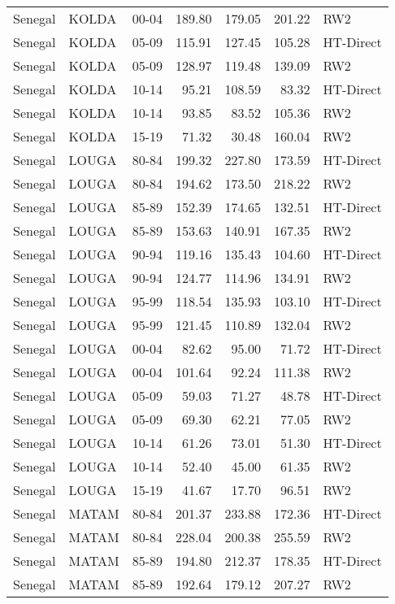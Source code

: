 \begin{longtable}{lllrrrl}
  Senegal & KOLDA & 00-04 & 189.80 & 179.05 & 201.22 & RW2 \\ 
  Senegal & KOLDA & 05-09 & 115.91 & 127.45 & 105.28 & HT-Direct \\ 
  Senegal & KOLDA & 05-09 & 128.97 & 119.48 & 139.09 & RW2 \\ 
  Senegal & KOLDA & 10-14 & 95.21 & 108.59 & 83.32 & HT-Direct \\ 
  Senegal & KOLDA & 10-14 & 93.85 & 83.52 & 105.36 & RW2 \\ 
  Senegal & KOLDA & 15-19 & 71.32 & 30.48 & 160.04 & RW2 \\ 
  Senegal & LOUGA & 80-84 & 199.32 & 227.80 & 173.59 & HT-Direct \\ 
  Senegal & LOUGA & 80-84 & 194.62 & 173.50 & 218.22 & RW2 \\ 
  Senegal & LOUGA & 85-89 & 152.39 & 174.65 & 132.51 & HT-Direct \\ 
  Senegal & LOUGA & 85-89 & 153.63 & 140.91 & 167.35 & RW2 \\ 
  Senegal & LOUGA & 90-94 & 119.16 & 135.43 & 104.60 & HT-Direct \\ 
  Senegal & LOUGA & 90-94 & 124.77 & 114.96 & 134.91 & RW2 \\ 
  Senegal & LOUGA & 95-99 & 118.54 & 135.93 & 103.10 & HT-Direct \\ 
  Senegal & LOUGA & 95-99 & 121.45 & 110.89 & 132.04 & RW2 \\ 
  Senegal & LOUGA & 00-04 & 82.62 & 95.00 & 71.72 & HT-Direct \\ 
  Senegal & LOUGA & 00-04 & 101.64 & 92.24 & 111.38 & RW2 \\ 
  Senegal & LOUGA & 05-09 & 59.03 & 71.27 & 48.78 & HT-Direct \\ 
  Senegal & LOUGA & 05-09 & 69.30 & 62.21 & 77.05 & RW2 \\ 
  Senegal & LOUGA & 10-14 & 61.26 & 73.01 & 51.30 & HT-Direct \\ 
  Senegal & LOUGA & 10-14 & 52.40 & 45.00 & 61.35 & RW2 \\ 
  Senegal & LOUGA & 15-19 & 41.67 & 17.70 & 96.51 & RW2 \\ 
  Senegal & MATAM & 80-84 & 201.37 & 233.88 & 172.36 & HT-Direct \\ 
  Senegal & MATAM & 80-84 & 228.04 & 200.38 & 255.59 & RW2 \\ 
  Senegal & MATAM & 85-89 & 194.80 & 212.37 & 178.35 & HT-Direct \\ 
  Senegal & MATAM & 85-89 & 192.64 & 179.12 & 207.27 & RW2 \\ 

\end{longtable}
